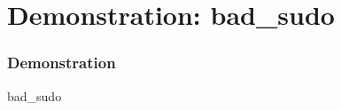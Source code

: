 \section{Demonstration: bad\_sudo}

\begin{frame}
  \frametitle{Demonstration}

  \begin{center}
    \Huge bad\_sudo
  \end{center}
%
\end{frame}
